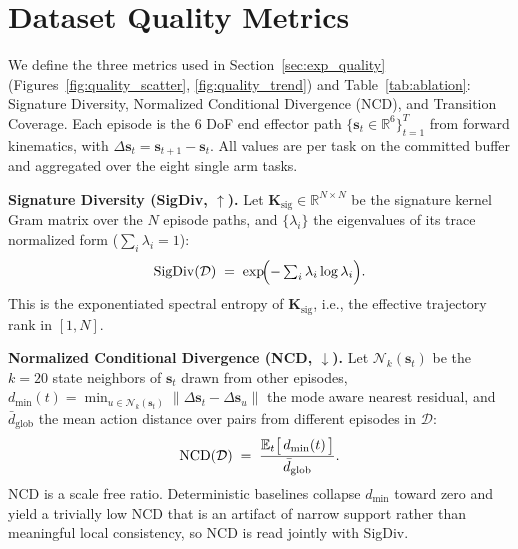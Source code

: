 \documentclass{article}
\begin{document}


\clearpage
\appendix
\renewcommand{\thetable}{A\arabic{table}}
\renewcommand{\thefigure}{A\arabic{figure}}
\setcounter{table}{0}
\setcounter{figure}{0}


\section{Dataset Quality Metrics}
\label{app:metrics}

We define the three metrics used in Section~\ref{sec:exp_quality} (Figures~\ref{fig:quality_scatter}, \ref{fig:quality_trend}) and Table~\ref{tab:ablation}: Signature Diversity, Normalized Conditional Divergence (NCD), and Transition Coverage. Each episode is the $6$ DoF end effector path $\{\mathbf{s}_t\!\in\!\mathbb{R}^{6}\}_{t=1}^{T}$ from forward kinematics, with $\Delta\mathbf{s}_t\!=\!\mathbf{s}_{t+1}\!-\!\mathbf{s}_t$. All values are per task on the committed buffer and aggregated over the eight single arm tasks.

\textbf{Signature Diversity (SigDiv, $\uparrow$).}
Let $\mathbf{K}_{\mathrm{sig}}\!\in\!\mathbb{R}^{N\times N}$ be the signature kernel Gram matrix over the $N$ episode paths, and $\{\lambda_i\}$ the eigenvalues of its trace normalized form ($\sum_i\lambda_i\!=\!1$):
\begin{equation} \small
\mathrm{SigDiv}(\mathcal{D}) \;=\; \exp\!\Bigl(-\textstyle\sum_{i}\lambda_i\log\lambda_i\Bigr).
\label{eq:metric-sigdiv}
\end{equation}
This is the exponentiated spectral entropy of $\mathbf{K}_{\mathrm{sig}}$, i.e., the effective trajectory rank in $[1, N]$.

\textbf{Normalized Conditional Divergence (NCD, $\downarrow$).}
Let $\mathcal{N}_k(\mathbf{s}_t)$ be the $k\!=\!20$ state neighbors of $\mathbf{s}_t$ drawn from other episodes, $d_{\min}(t)\!=\!\min_{u\in\mathcal{N}_k(\mathbf{s}_t)}\lVert\Delta\mathbf{s}_t-\Delta\mathbf{s}_u\rVert$ the mode aware nearest residual, and $\bar d_{\mathrm{glob}}$ the mean action distance over pairs from different episodes in $\mathcal{D}$:
\begin{equation} \small
\mathrm{NCD}(\mathcal{D}) \;=\; \frac{\mathbb{E}_t\bigl[\,d_{\min}(t)\,\bigr]}{\bar d_{\mathrm{glob}}}.
\label{eq:metric-ncd}
\end{equation}
NCD is a scale free ratio. Deterministic baselines collapse $d_{\min}$ toward zero and yield a trivially low NCD that is an artifact of narrow support rather than meaningful local consistency, so NCD is read jointly with SigDiv.
\end{document}
